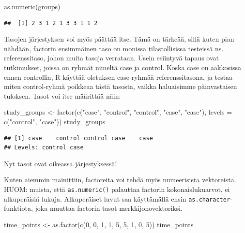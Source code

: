 \documentclass[
]{book}
\newenvironment{Shaded}{\begin{snugshade}}{\end{snugshade}}
\newcommand{\AttributeTok}[1]{\textcolor[rgb]{0.77,0.63,0.00}{#1}}
\newcommand{\DecValTok}[1]{\textcolor[rgb]{0.00,0.00,0.81}{#1}}
\newcommand{\FunctionTok}[1]{\textcolor[rgb]{0.00,0.00,0.00}{#1}}
\newcommand{\NormalTok}[1]{#1}
\newcommand{\OtherTok}[1]{\textcolor[rgb]{0.56,0.35,0.01}{#1}}
\newcommand{\StringTok}[1]{\textcolor[rgb]{0.31,0.60,0.02}{#1}}
\begin{document}
\begin{Shaded}
\begin{Highlighting}[]
\FunctionTok{as.numeric}\NormalTok{(groups)}
\end{Highlighting}
\end{Shaded}

\begin{verbatim}
##  [1] 2 3 1 2 1 3 3 1 1 2
\end{verbatim}

Tasojen järjestyksen voi myös päättää itse. Tämä on tärkeää, sillä kuten pian nähdään, factorin ensimmäinen taso on monissa tilastollisissa testeissä ns. referenssitaso, johon muita tasoja verrataan. Usein esiintyvä tapaus ovat tutkimukset, joissa on ryhmät nimeltä case ja control. Koska case on aakkosissa ennen controllia, R käyttää oletuksen case-ryhmää referenssitasona, ja testaa miten control-ryhmä poikkeaa tästä tasosta, vaikka haluaisimme päinvastaisen tuloksen. Tasot voi itse määrittää näin:

\begin{Shaded}
\begin{Highlighting}[]
\NormalTok{study\_groups }\OtherTok{\textless{}{-}} \FunctionTok{factor}\NormalTok{(}\FunctionTok{c}\NormalTok{(}\StringTok{"case"}\NormalTok{, }\StringTok{"control"}\NormalTok{, }\StringTok{"control"}\NormalTok{, }\StringTok{"case"}\NormalTok{, }\StringTok{"case"}\NormalTok{),}
                       \AttributeTok{levels =} \FunctionTok{c}\NormalTok{(}\StringTok{"control"}\NormalTok{, }\StringTok{"case"}\NormalTok{))}
\NormalTok{study\_groups}
\end{Highlighting}
\end{Shaded}

\begin{verbatim}
## [1] case    control control case    case   
## Levels: control case
\end{verbatim}

Nyt tasot ovat oikeassa järjestyksessä!

Kuten aiemmin mainittiin, factoreita voi tehdä myös numeerisista vektoreista. HUOM: muista, että \texttt{as.numeric()} palauttaa factorin kokonaislukuarvot, ei alkuperäisiä lukuja. Alkuperäiset luvut saa käyttämällä ensin \texttt{as.character}-funktiota, joka muuttaa factorin tasot merkkijonovektoriksi.

\begin{Shaded}
\begin{Highlighting}[]
\NormalTok{time\_points }\OtherTok{\textless{}{-}} \FunctionTok{as.factor}\NormalTok{(}\FunctionTok{c}\NormalTok{(}\DecValTok{0}\NormalTok{, }\DecValTok{0}\NormalTok{, }\DecValTok{1}\NormalTok{, }\DecValTok{1}\NormalTok{, }\DecValTok{5}\NormalTok{, }\DecValTok{5}\NormalTok{, }\DecValTok{1}\NormalTok{, }\DecValTok{0}\NormalTok{, }\DecValTok{5}\NormalTok{))}
\NormalTok{time\_points}
\end{Highlighting}
\end{Shaded}
\end{document}
